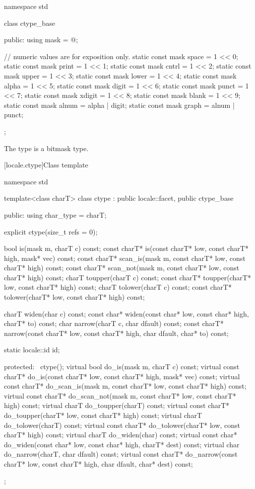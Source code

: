 %
\begin{codeblock}
namespace std {
  class ctype_base {
  public:
    using mask = @\seebelow@;

    // numeric values are for exposition only.
    static const mask space  = 1 << 0;
    static const mask print  = 1 << 1;
    static const mask cntrl  = 1 << 2;
    static const mask upper  = 1 << 3;
    static const mask lower  = 1 << 4;
    static const mask alpha  = 1 << 5;
    static const mask digit  = 1 << 6;
    static const mask punct  = 1 << 7;
    static const mask xdigit = 1 << 8;
    static const mask blank  = 1 << 9;
    static const mask alnum  = alpha | digit;
    static const mask graph  = alnum | punct;
  };
}
\end{codeblock}

\pnum
The type
is a bitmask type.

[locale.ctype]{Class template }

%
\begin{codeblock}
namespace std {
  template<class charT>
    class ctype : public locale::facet, public ctype_base {
    public:
      using char_type = charT;

      explicit ctype(size_t refs = 0);

      bool         is(mask m, charT c) const;
      const charT* is(const charT* low, const charT* high, mask* vec) const;
      const charT* scan_is(mask m, const charT* low, const charT* high) const;
      const charT* scan_not(mask m, const charT* low, const charT* high) const;
      charT        toupper(charT c) const;
      const charT* toupper(charT* low, const charT* high) const;
      charT        tolower(charT c) const;
      const charT* tolower(charT* low, const charT* high) const;

      charT        widen(char c) const;
      const char*  widen(const char* low, const char* high, charT* to) const;
      char         narrow(charT c, char dfault) const;
      const charT* narrow(const charT* low, const charT* high, char dfault, char* to) const;

      static locale::id id;

    protected:
      ~ctype();
      virtual bool         do_is(mask m, charT c) const;
      virtual const charT* do_is(const charT* low, const charT* high, mask* vec) const;
      virtual const charT* do_scan_is(mask m, const charT* low, const charT* high) const;
      virtual const charT* do_scan_not(mask m, const charT* low, const charT* high) const;
      virtual charT        do_toupper(charT) const;
      virtual const charT* do_toupper(charT* low, const charT* high) const;
      virtual charT        do_tolower(charT) const;
      virtual const charT* do_tolower(charT* low, const charT* high) const;
      virtual charT        do_widen(char) const;
      virtual const char*  do_widen(const char* low, const char* high, charT* dest) const;
      virtual char         do_narrow(charT, char dfault) const;
      virtual const charT* do_narrow(const charT* low, const charT* high,
                                     char dfault, char* dest) const;
    };
}
\end{codeblock}

